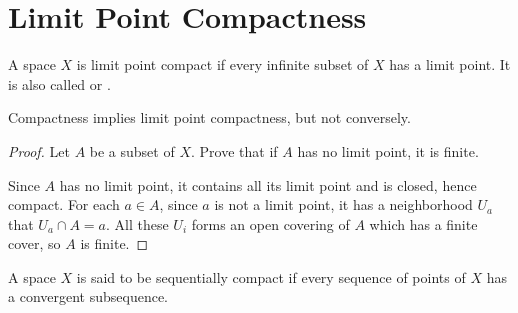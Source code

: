 
\section{Limit Point Compactness}

\begin{definition}
    A space $X$ is limit point compact if every infinite subset of $X$ has a limit point. It is also called  or .
\end{definition}

\begin{theorem}
    Compactness implies limit point compactness, but not conversely.    
\end{theorem}
\begin{proof}
    Let $A$ be a subset of $X$. Prove that if $A$ has no limit point, it is finite. 
    
    Since $A$ has no limit point, it contains all its limit point and is closed, hence compact. For each $a \in A$, since $a$ is not a limit point, it has a neighborhood $U_a$ that $U_a \cap A = a$. All these $U_i$ forms an open covering of $A$ which has a finite cover, so $A$ is finite.
\end{proof}

\begin{definition}
    A space $X$ is said to be sequentially compact if every sequence of points of $X$ has a convergent subsequence.
\end{definition}

